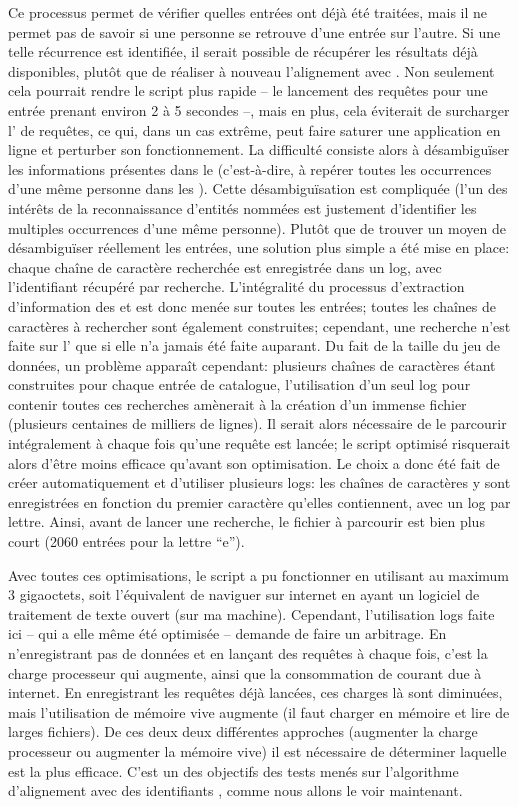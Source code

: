 Ce processus permet de vérifier quelles entrées ont déjà été traitées, mais il ne permet pas de savoir si une personne se retrouve d'une entrée sur l'autre. Si une telle récurrence est identifiée, il serait possible de récupérer les résultats déjà disponibles, plutôt que de réaliser à nouveau l'alignement avec \wkd{}. Non seulement cela pourrait rendre le script plus rapide -- le lancement des requêtes pour une entrée prenant environ 2 à 5 secondes --, mais en plus, cela éviterait de surcharger l'\api{} de requêtes, ce qui, dans un cas extrême, peut faire saturer une application en ligne et perturber son fonctionnement. La difficulté consiste alors à désambiguïser les informations présentes dans le \tname{} (c'est-à-dire, à repérer toutes les occurrences d'une même personne dans les \tname{}). Cette désambiguïsation est compliquée (l'un des intérêts de la reconnaissance d'entités nommées est justement d'identifier les multiples occurrences d'une même personne). Plutôt que de trouver un moyen de désambiguïser réellement les entrées, une solution plus simple a été mise en place: chaque chaîne de caractère recherchée est enregistrée dans un \gls{log}, avec l'identifiant \wkd{} récupéré par recherche. L'intégralité du processus d'extraction d'information des \tname{} et \ttrait{} est donc menée sur toutes les entrées; toutes les chaînes de caractères à rechercher sont également construites; cependant, une recherche n'est faite sur l'\api{} que si elle n'a jamais été faite auparant. Du fait de la taille du jeu de données, un problème apparaît cependant: plusieurs chaînes de caractères étant construites pour chaque entrée de catalogue, l'utilisation d'un seul \gls{log} pour contenir toutes ces recherches amènerait à la création d'un immense fichier (plusieurs centaines de milliers de lignes). Il serait alors nécessaire de le parcourir intégralement à chaque fois qu'une requête est lancée; le script optimisé risquerait alors d'être moins efficace qu'avant son optimisation. Le choix a donc été fait de créer automatiquement et d'utiliser plusieurs \glspl{log}: les chaînes de caractères y sont enregistrées en fonction du premier caractère qu'elles contiennent, avec un \gls{log} par lettre. Ainsi, avant de lancer une recherche, le fichier à parcourir est bien plus court (2060 entrées pour la lettre \enquote{e}).

Avec toutes ces optimisations, le script a pu fonctionner en utilisant au maximum 3 gigaoctets, soit l'équivalent de naviguer sur internet en ayant un logiciel de traitement de texte ouvert (sur ma machine). Cependant, l'utilisation \glspl{log} faite ici -- qui a elle même été optimisée -- demande de faire un arbitrage. En n'enregistrant pas de données et en lançant des requêtes à chaque fois, c'est la charge processeur qui augmente, ainsi que la consommation de courant due à internet. En enregistrant les requêtes déjà lancées, ces charges là sont diminuées, mais l'utilisation de mémoire vive augmente (il faut charger en mémoire et lire de larges fichiers). De ces deux deux différentes approches (augmenter la charge processeur ou augmenter la mémoire vive) il est nécessaire de déterminer laquelle est la plus efficace. C'est un des objectifs des tests menés sur l'algorithme d'alignement avec des identifiants \wkd{}, comme nous allons le voir maintenant.

